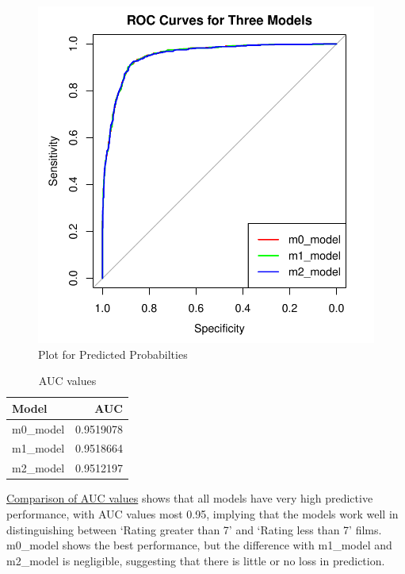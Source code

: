 \documentclass[
  letterpaper,
  DIV=11,
  numbers=noendperiod]{scrartcl}
\begin{document}
\begin{figure}

{\centering \includegraphics{Group_06_Analysis_files/figure-pdf/fig-ROC-AUC-1.pdf}

}

\caption{\label{fig-ROC-AUC}Plot for Predicted Probabilties}

\end{figure}

\clearpage

\hypertarget{tbl-auc}{}
\begin{longtable}{lr}
\caption{\label{tbl-auc}AUC values }\tabularnewline

\toprule
Model & AUC \\ 
\midrule\addlinespace[2.5pt]
m0\_model & 0.9519078 \\ 
m1\_model & 0.9518664 \\ 
m2\_model & 0.9512197 \\ 
\bottomrule
\end{longtable}

\ul{Comparison of AUC values} shows that all models have very high
predictive performance, with AUC values most 0.95, implying that the
models work well in distinguishing between `Rating greater than 7' and
`Rating less than 7' films. m0\_model shows the best performance, but
the difference with m1\_model and m2\_model is negligible, suggesting
that there is little or no loss in prediction.
\end{document}
